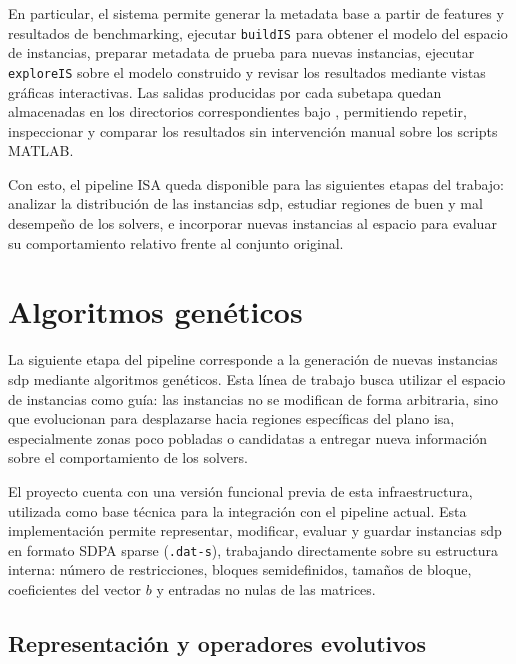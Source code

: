 En particular, el sistema permite generar la metadata base a partir de features y
resultados de benchmarking, ejecutar \texttt{buildIS} para obtener el modelo del
espacio de instancias, preparar metadata de prueba para nuevas instancias, ejecutar
\texttt{exploreIS} sobre el modelo construido y revisar los resultados mediante
vistas gráficas interactivas.
Las salidas producidas por cada subetapa quedan almacenadas en los directorios
correspondientes bajo , permitiendo repetir, inspeccionar y
comparar los resultados sin intervención manual sobre los scripts MATLAB.

Con esto, el pipeline ISA queda disponible para las siguientes etapas del trabajo:
analizar la distribución de las instancias \acrshort{sdp}, estudiar regiones de buen
y mal desempeño de los solvers, e incorporar nuevas instancias al espacio para
evaluar su comportamiento relativo frente al conjunto original.

\newpage
\section{Algoritmos genéticos}
\label{sec:avance_algoritmos_geneticos}

La siguiente etapa del pipeline corresponde a la generación de nuevas instancias
\acrshort{sdp} mediante algoritmos genéticos.
Esta línea de trabajo busca utilizar el espacio de instancias como guía: las
instancias no se modifican de forma arbitraria, sino que evolucionan para desplazarse
hacia regiones específicas del plano \acrshort{isa}, especialmente zonas poco
pobladas o candidatas a entregar nueva información sobre el comportamiento de los
solvers.

El proyecto cuenta con una versión funcional previa de esta infraestructura, utilizada
como base técnica para la integración con el pipeline actual.
Esta implementación permite representar, modificar, evaluar y guardar instancias
\acrshort{sdp} en formato SDPA sparse (\texttt{.dat-s}), trabajando directamente
sobre su estructura interna: número de restricciones, bloques semidefinidos, tamaños
de bloque, coeficientes del vector $b$ y entradas no nulas de las matrices.

\subsection{Representación y operadores evolutivos}
\label{subsec:avance_ga_representacion}

